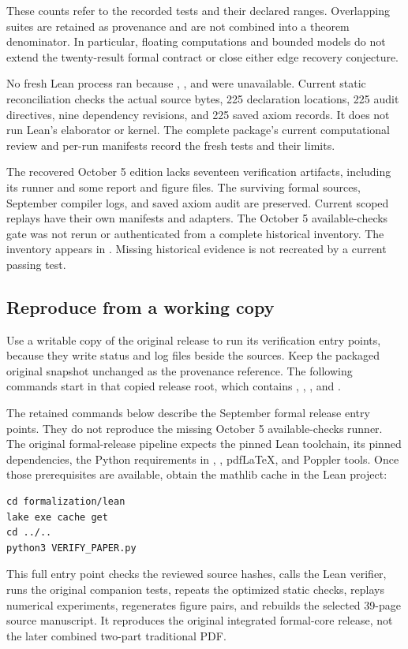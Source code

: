 These counts refer to the recorded tests and their declared ranges. Overlapping suites are retained as provenance and are not combined into a theorem denominator. In particular, floating computations and bounded models do not extend the twenty-result formal contract or close either edge recovery conjecture.

No fresh Lean process ran because , , and  were unavailable. Current static reconciliation checks the actual source bytes, 225 declaration locations, 225 audit directives, nine dependency revisions, and 225 saved axiom records. It does not run Lean's elaborator or kernel. The complete package's current computational review and per-run manifests record the fresh tests and their limits.

The recovered October 5 edition lacks seventeen verification artifacts, including its  runner and some report and figure files. The surviving formal sources, September compiler logs, and saved axiom audit are preserved. Current scoped replays have their own manifests and adapters. The October 5 available-checks gate was not rerun or authenticated from a complete historical inventory. The inventory appears in . Missing historical evidence is not recreated by a current passing test.

\subsection{Reproduce from a working copy}
Use a writable copy of the original release to run its verification entry points, because they write status and log files beside the sources. Keep the packaged original snapshot unchanged as the provenance reference. The following commands start in that copied release root, which contains , , , and .

The retained commands below describe the September formal release entry points. They do not reproduce the missing October 5 available-checks runner. The original formal-release pipeline expects the pinned Lean toolchain, its pinned dependencies, the Python requirements in , , pdfLaTeX, and Poppler tools. Once those prerequisites are available, obtain the mathlib cache in the Lean project:
\begin{Verbatim}[fontsize=\small,frame=leftline,breaklines=true]
cd formalization/lean
lake exe cache get
cd ../..
python3 VERIFY_PAPER.py
\end{Verbatim}
This full entry point checks the reviewed source hashes, calls the Lean verifier, runs the original companion tests, repeats the optimized static checks, replays numerical experiments, regenerates figure pairs, and rebuilds the selected 39-page source manuscript. It reproduces the original integrated formal-core release, not the later combined two-part traditional PDF.

